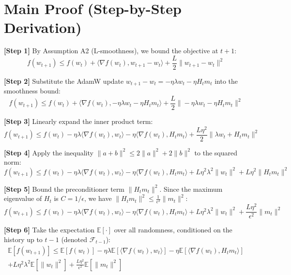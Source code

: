 \documentclass[11pt]{article}
\begin{document}
\section*{Main Proof (Step-by-Step Derivation)}

\textbf{[Step 1]} By Assumption A2 (L-smoothness), we bound the objective at $t+1$:
\begin{equation}
    f(w_{t+1}) \leq f(w_t) + \langle \nabla f(w_t), w_{t+1} - w_t \rangle + \frac{L}{2} \|w_{t+1} - w_t\|^2
\end{equation}

\textbf{[Step 2]} Substitute the AdamW update $w_{t+1} - w_t = -\eta \lambda w_t - \eta H_t m_t$ into the smoothness bound:
\begin{equation}
    f(w_{t+1}) \leq f(w_t) + \langle \nabla f(w_t), -\eta \lambda w_t - \eta H_t m_t \rangle + \frac{L}{2} \|-\eta \lambda w_t - \eta H_t m_t\|^2
\end{equation}

\textbf{[Step 3]} Linearly expand the inner product term:
\begin{equation}
    f(w_{t+1}) \leq f(w_t) - \eta \lambda \langle \nabla f(w_t), w_t \rangle - \eta \langle \nabla f(w_t), H_t m_t \rangle + \frac{L \eta^2}{2} \|\lambda w_t + H_t m_t\|^2
\end{equation}

\textbf{[Step 4]} Apply the inequality $\|a+b\|^2 \leq 2\|a\|^2 + 2\|b\|^2$ to the squared norm:
\begin{equation}
    f(w_{t+1}) \leq f(w_t) - \eta \lambda \langle \nabla f(w_t), w_t \rangle - \eta \langle \nabla f(w_t), H_t m_t \rangle + L \eta^2 \lambda^2 \|w_t\|^2 + L \eta^2 \|H_t m_t\|^2
\end{equation}

\textbf{[Step 5]} Bound the preconditioner term $\|H_t m_t\|^2$. Since the maximum eigenvalue of $H_t$ is $C = 1/\epsilon$, we have $\|H_t m_t\|^2 \leq \frac{1}{\epsilon^2} \|m_t\|^2$:
\begin{equation}
    f(w_{t+1}) \leq f(w_t) - \eta \lambda \langle \nabla f(w_t), w_t \rangle - \eta \langle \nabla f(w_t), H_t m_t \rangle + L \eta^2 \lambda^2 \|w_t\|^2 + \frac{L \eta^2}{\epsilon^2} \|m_t\|^2
\end{equation}

\textbf{[Step 6]} Take the expectation $\mathbb{E}[\cdot]$ over all randomness, conditioned on the history up to $t-1$ (denoted $\mathcal{F}_{t-1}$):
\begin{align}
    \mathbb{E}[f(w_{t+1})] \leq \mathbb{E}[f(w_t)] - \eta \lambda \mathbb{E}[\langle \nabla f(w_t), w_t \rangle] - \eta \mathbb{E}[\langle \nabla f(w_t), H_t m_t \rangle] \nonumber \\
    + L \eta^2 \lambda^2 \mathbb{E}[\|w_t\|^2] + \frac{L \eta^2}{\epsilon^2} \mathbb{E}[\|m_t\|^2]
\end{align}
\end{document}
